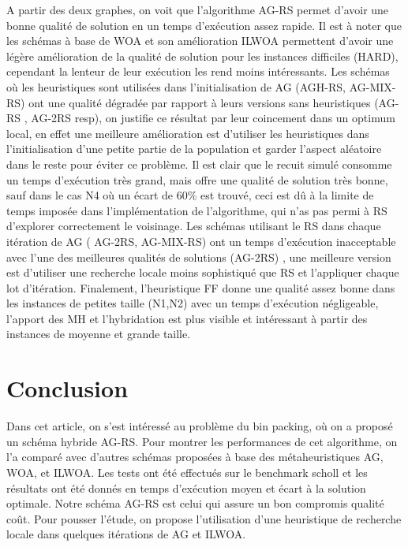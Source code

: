 \documentclass[preprint]{elsarticle}
\begin{document}
A partir des deux graphes, on voit que l’algorithme AG-RS permet d’avoir une bonne qualité de solution en un temps d’exécution assez rapide. Il est à noter que les schémas à base de WOA et son amélioration ILWOA permettent d’avoir une légère amélioration de la qualité de solution pour les instances difficiles (HARD), cependant la lenteur de leur exécution les rend moins intéressants.
 Les schémas où les heuristiques sont utilisées dans l’initialisation de AG (AGH-RS, AG-MIX-RS) ont une qualité dégradée par rapport à leurs versions sans heuristiques (AG-RS , AG-2RS resp),
  on justifie ce résultat par leur coincement dans un optimum local, en effet une meilleure amélioration est d’utiliser les heuristiques dans l’initialisation d’une petite partie de la population et garder l’aspect aléatoire dans le reste pour éviter ce problème. Il est clair que le recuit simulé consomme un temps d'exécution très grand, mais offre une qualité de solution très bonne,
   sauf dans le cas N4 où un écart de 60\% est trouvé, ceci est dû à la limite de temps imposée dans l'implémentation de l’algorithme, qui n’as pas permi à RS d’explorer correctement le voisinage. 
   Les schémas utilisant le RS dans chaque itération de AG ( AG-2RS, AG-MIX-RS) ont un temps d'exécution inacceptable avec l’une des meilleures qualités de solutions (AG-2RS) , une meilleure version est d'utiliser une recherche locale moins sophistiqué que RS et l’appliquer chaque lot d’itération.
    Finalement, l’heuristique FF donne une qualité assez bonne dans les instances de petites taille (N1,N2) avec un temps d'exécution négligeable, l’apport des MH et l’hybridation est plus visible et intéressant à partir des instances de moyenne et grande taille. 

\section{Conclusion}
Dans cet article, on s’est intéressé au problème du bin packing, où on a proposé un schéma hybride AG-RS. Pour montrer les performances de cet algorithme, on l’a comparé avec d’autres schémas proposées à base des métaheuristiques AG, WOA, et ILWOA. Les tests ont été effectués sur le benchmark scholl et les résultats ont été donnés en temps d'exécution moyen et écart à la solution optimale. Notre schéma AG-RS est celui qui assure un bon compromis qualité coût. Pour pousser l’étude, on propose l’utilisation d’une heuristique de recherche locale dans quelques itérations de AG et ILWOA. 
\medskip


\end{document}
